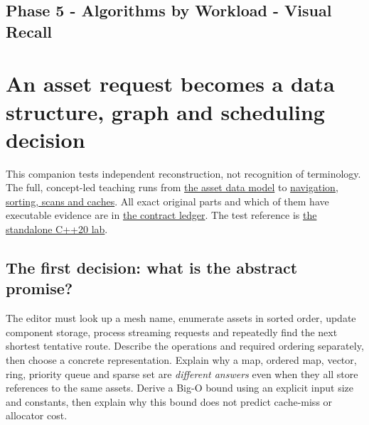 \hypertarget{appendix-8a046b38375e}{}
\section*{Phase 5 - Algorithms by Workload - Visual Recall}
\chapter{An asset request becomes a data structure, graph and scheduling decision}\label{appendix-8a046b38375e-an-asset-request-becomes-a-data-structure-graph-and-scheduling-decision}

This companion tests independent reconstruction, not recognition of terminology. The full, concept-led teaching runs from \href{Continuous\%20Notes/Computing\%20Foundations\%20-\%20From\%20Bits\%20to\%20C++\%20and\%20Systems\%20APIs\#The\%20scene\%20is\%20now\%20too\%20large\%20for\%20the\%20wrong\%20container\%20—\%20Phase\%205,\%20M025–M027,\%20Parts\%20401–445}{the asset data model} to \href{Continuous\%20Notes/Computing\%20Foundations\%20-\%20From\%20Bits\%20to\%20C++\%20and\%20Systems\%20APIs\#From\%20an\%20asset\%20map\%20to\%20a\%20correct\%20navigable\%20world\%20—\%20Phase\%205,\%20M028–M030,\%20Parts\%20446–500}{navigation, sorting, scans and caches}. All exact original parts and which of them have executable evidence are in \hyperref[appendix-fd090d982a15-phase-5-algorithms-and-data-structure-workload-contracts-parts-401500]{the contract ledger}. The test reference is \href{tools/labs/phase5_algorithm_workload_lab.cpp}{the standalone C++20 lab}.

\section{The first decision: what is the abstract promise?}\label{appendix-8a046b38375e-the-first-decision-what-is-the-abstract-promise}

The editor must look up a mesh name, enumerate assets in sorted order, update component storage, process streaming requests and repeatedly find the next shortest tentative route. Describe the operations and required ordering separately, then choose a concrete representation. Explain why a map, ordered map, vector, ring, priority queue and sparse set are \emph{different answers} even when they all store references to the same assets. Derive a Big-O bound using an explicit input size and constants, then explain why this bound does not predict cache-miss or allocator cost.

